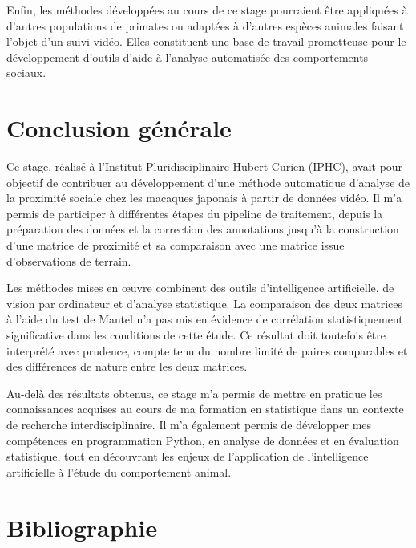 \documentclass[11pt,a4paper]{report}
\begin{document}
Enfin, les méthodes développées au cours de ce stage pourraient être
appliquées à d'autres populations de primates ou adaptées à d'autres
espèces animales faisant l'objet d'un suivi vidéo. Elles constituent une
base de travail prometteuse pour le développement d'outils d'aide à
l'analyse automatisée des comportements sociaux.

\chapter*{Conclusion générale}

Ce stage, réalisé à l'Institut Pluridisciplinaire Hubert Curien (IPHC),
avait pour objectif de contribuer au développement d'une méthode
automatique d'analyse de la proximité sociale chez les macaques japonais
à partir de données vidéo. Il m'a permis de participer à différentes
étapes du pipeline de traitement, depuis la préparation des données et
la correction des annotations jusqu'à la construction d'une matrice de
proximité et sa comparaison avec une matrice issue d'observations de
terrain.

Les méthodes mises en œuvre combinent des outils d'intelligence
artificielle, de vision par ordinateur et d'analyse statistique. La
comparaison des deux matrices à l'aide du test de Mantel n'a pas mis en
évidence de corrélation statistiquement significative dans les conditions
de cette étude. Ce résultat doit toutefois être interprété avec
prudence, compte tenu du nombre limité de paires comparables et des
différences de nature entre les deux matrices.

Au-delà des résultats obtenus, ce stage m'a permis de mettre en pratique
les connaissances acquises au cours de ma formation en statistique dans
un contexte de recherche interdisciplinaire. Il m'a également permis de
développer mes compétences en programmation Python, en analyse de
données et en évaluation statistique, tout en découvrant les enjeux de
l'application de l'intelligence artificielle à l'étude du comportement
animal.



\chapter*{Bibliographie}
\end{document}
